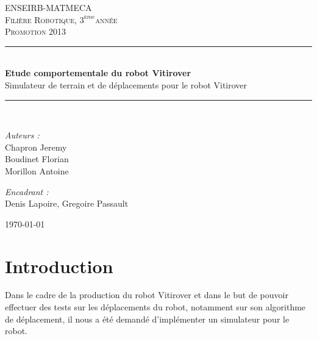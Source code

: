 \documentclass[usenames,dvipsnames]{report}
\def\titre{Etude comportementale
    du robot Vitirover}
\def\filiere{Robotique}
\def\annee{$3^{ème}$}  %
\def\promotion{2013}
\def\equipe{Chapron Jeremy\\Boudinet Florian\\Morillon Antoine}
\def\encadrant{Denis Lapoire, Gregoire Passault}
\newcommand{\HRule}{\rule{\linewidth}{0.5mm}}
\begin{document}
    \begin{titlepage}

    \begin{center}



    \textsc{\LARGE ENSEIRB-MATMECA}\\[1cm]

    \textsc{\Large {Filière \filiere, \annee année}}\\[0.5cm]
    \textsc{\Large {Promotion \promotion}}\\[0.5cm]

    \HRule \\[0.4cm]
    { \huge \bfseries \titre}\\[0.4cm]
    Simulateur de terrain et de déplacements pour le robot Vitirover
    \\
    \HRule \\[1.5cm]

    \begin{minipage}{0.4\textwidth}
    \begin{flushleft} \large
    \emph{Auteurs :}\\
    \equipe
    \end{flushleft}
    \end{minipage}
    \begin{minipage}{0.4\textwidth}
    \begin{flushright} \large
    \emph{Encadrant :} \\
    \encadrant
    \end{flushright}
    \end{minipage}

    \vfill

    {\large \today}

    \end{center}

    \end{titlepage}



    \tableofcontents

    \chapter{Introduction}
    Dans le cadre de la production du robot Vitirover et dans le but de pouvoir effectuer des tests sur les déplacements du robot, notamment sur son algorithme de déplacement, il nous a été demandé d’implémenter un simulateur pour le robot. 
\end{document}

